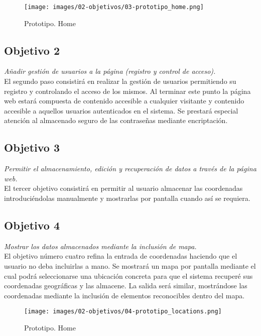 \begin{figure}[h!btp]
\centering
\texttt{[image: images/02-objetivos/03-prototipo\_home.png]}
\caption{Prototipo. Home}
\label{fig:prototipo_Home}
\end{figure}

\subsection{Objetivo 2}
\emph{Añadir gestión de usuarios a la página (registro y control de acceso).}\\
El segundo paso consistirá en realizar la gestión de usuarios permitiendo su registro y controlando el acceso de los mismos. Al terminar este punto la página web estará compuesta de contenido accesible a cualquier visitante y contenido accesible a aquellos usuarios autenticados en el sistema. Se prestará especial atención al almacenado seguro de las contraseñas mediante encriptación.

\subsection{Objetivo 3}
\emph{Permitir el almacenamiento, edición y recuperación de datos a través de la página web.}\\
El tercer objetivo consistirá en permitir al usuario almacenar las coordenadas introduciéndolas manualmente y mostrarlas por pantalla cuando así se requiera.

\subsection{Objetivo 4}
\emph{Mostrar los datos almacenados mediante la inclusión de mapa.}\\
El objetivo número cuatro refina la entrada de coordenadas haciendo que el usuario no deba incluirlas a mano. Se mostrará un mapa por pantalla mediante el cual podrá seleccionarse una ubicación concreta para que el sistema recuperé sus coordenadas geográficas y las almacene. La salida será similar, mostrándose las coordenadas mediante la inclusión de elementos reconocibles dentro del mapa.

\begin{figure}[h!btp]
\centering
\texttt{[image: images/02-objetivos/04-prototipo\_locations.png]}
\caption{Prototipo. Home}
\label{fig:prototipo_Home}
\end{figure}


